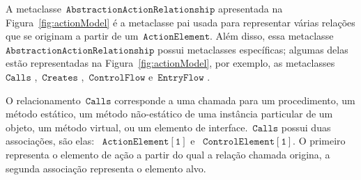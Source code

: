 
A metaclasse~$\mathtt{AbstractionActionRelationship}$ apresentada na Figura~\ref{fig:actionModel}  é a metaclasse pai usada para representar várias relações que se originam a partir de um~$\mathtt{ActionElement}$. Além disso, essa metaclasse~$\mathtt{AbstractionActionRelationship}$ possui metaclasses específicas; algumas delas estão representadas na Figura~\ref{fig:actionModel}, por exemplo, as metaclasses~$\mathtt{Calls}$ ,~$\mathtt{Creates}$ ,~$\mathtt{ControlFlow}$  e~$\mathtt{EntryFlow}$ .


O relacionamento~$\mathtt{Calls}$ corresponde a uma chamada para um procedimento, um método estático, um método não-estático de uma instância particular de um objeto, um método virtual, ou um elemento de interface.~$\mathtt{Calls}$ possui duas associações, são elas: ~$\mathtt{ActionElement[1]}$ e ~$\mathtt{ControlElement[1]}$. O primeiro representa o elemento de ação a partir do qual a relação chamada origina, a segunda associação representa o elemento alvo.



